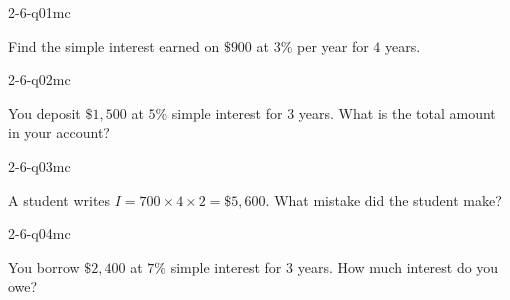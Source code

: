 

\begin{practiceQuestion}{2-6-q01}{mc}
\begin{questionText}
Find the simple interest earned on $\$900$ at $3\%$ per year for $4$ years.
\end{questionText}
\end{practiceQuestion}

\begin{practiceQuestion}{2-6-q02}{mc}
\begin{questionText}
You deposit $\$1{,}500$ at $5\%$ simple interest for $3$ years. What is the total amount in your account?
\end{questionText}
\end{practiceQuestion}

\begin{practiceQuestion}{2-6-q03}{mc}
\begin{questionText}
A student writes $I = 700 \times 4 \times 2 = \$5{,}600$. What mistake did the student make?
\end{questionText}
\end{practiceQuestion}

\begin{practiceQuestion}{2-6-q04}{mc}
\begin{questionText}
You borrow $\$2{,}400$ at $7\%$ simple interest for $3$ years. How much interest do you owe?
\end{questionText}
\end{practiceQuestion}

